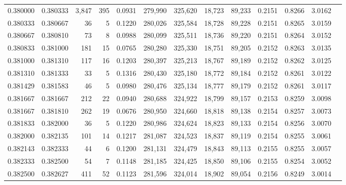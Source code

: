 \begin{tabular}{rrrrrrrrrrrrr}
0.380000 & 0.380333 & 3,847 & 395 &                                     0.0931 & 279,990 & 325,620 &  18,723 &  89,233 & 0.2151 & 0.8266 & 3.0162 \\
0.380333 & 0.380667 &    36 &   5 &                                     0.1220 & 280,026 & 325,584 &  18,728 &  89,228 & 0.2151 & 0.8265 & 3.0159 \\
0.380667 & 0.380810 &    73 &   8 &                                     0.0988 & 280,099 & 325,511 &  18,736 &  89,220 & 0.2151 & 0.8264 & 3.0152 \\
0.380833 & 0.381000 &   181 &  15 &                                     0.0765 & 280,280 & 325,330 &  18,751 &  89,205 & 0.2152 & 0.8263 & 3.0135 \\
0.381000 & 0.381310 &   117 &  16 &                                     0.1203 & 280,397 & 325,213 &  18,767 &  89,189 & 0.2152 & 0.8262 & 3.0125 \\
0.381310 & 0.381333 &    33 &   5 &                                     0.1316 & 280,430 & 325,180 &  18,772 &  89,184 & 0.2152 & 0.8261 & 3.0122 \\
0.381429 & 0.381583 &    46 &   5 &                                     0.0980 & 280,476 & 325,134 &  18,777 &  89,179 & 0.2152 & 0.8261 & 3.0117 \\
0.381667 & 0.381667 &   212 &  22 &                                     0.0940 & 280,688 & 324,922 &  18,799 &  89,157 & 0.2153 & 0.8259 & 3.0098 \\
0.381667 & 0.381810 &   262 &  19 &                                     0.0676 & 280,950 & 324,660 &  18,818 &  89,138 & 0.2154 & 0.8257 & 3.0073 \\
0.381833 & 0.382000 &    36 &   5 &                                     0.1220 & 280,986 & 324,624 &  18,823 &  89,133 & 0.2154 & 0.8256 & 3.0070 \\
0.382000 & 0.382135 &   101 &  14 &                                     0.1217 & 281,087 & 324,523 &  18,837 &  89,119 & 0.2154 & 0.8255 & 3.0061 \\
0.382143 & 0.382333 &    44 &   6 &                                     0.1200 & 281,131 & 324,479 &  18,843 &  89,113 & 0.2155 & 0.8255 & 3.0057 \\
0.382333 & 0.382500 &    54 &   7 &                                     0.1148 & 281,185 & 324,425 &  18,850 &  89,106 & 0.2155 & 0.8254 & 3.0052 \\
0.382500 & 0.382627 &   411 &  52 &                                     0.1123 & 281,596 & 324,014 &  18,902 &  89,054 & 0.2156 & 0.8249 & 3.0014 \\

\end{tabular}
